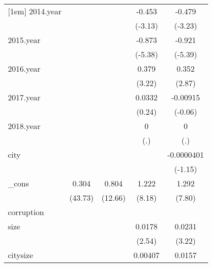 {\begin{tabular}{l*{4}{c}}
[1em]
2014.year   &                     &                     &      -0.453\sym{**} &      -0.479\sym{**} \\
            &                     &                     &     (-3.13)         &     (-3.23)         \\
[1em]
2015.year   &                     &                     &      -0.873\sym{***}&      -0.921\sym{***}\\
            &                     &                     &     (-5.38)         &     (-5.39)         \\
[1em]
2016.year   &                     &                     &       0.379\sym{**} &       0.352\sym{**} \\
            &                     &                     &      (3.22)         &      (2.87)         \\
[1em]
2017.year   &                     &                     &      0.0332         &    -0.00915         \\
            &                     &                     &      (0.24)         &     (-0.06)         \\
[1em]
2018.year   &                     &                     &           0         &           0         \\
            &                     &                     &         (.)         &         (.)         \\
[1em]
city        &                     &                     &                     &  -0.0000401         \\
            &                     &                     &                     &     (-1.15)         \\
[1em]
\_cons      &       0.304\sym{***}&       0.804\sym{***}&       1.222\sym{***}&       1.292\sym{***}\\
            &     (43.73)         &     (12.66)         &      (8.18)         &      (7.80)         \\
\hline
corruption  &                     &                     &                     &                     \\
size        &                     &                     &      0.0178\sym{*}  &      0.0231\sym{**} \\
            &                     &                     &      (2.54)         &      (3.22)         \\
[1em]
citysize    &                     &                     &     0.00407         &      0.0157\sym{**} \\

\end{tabular}}
